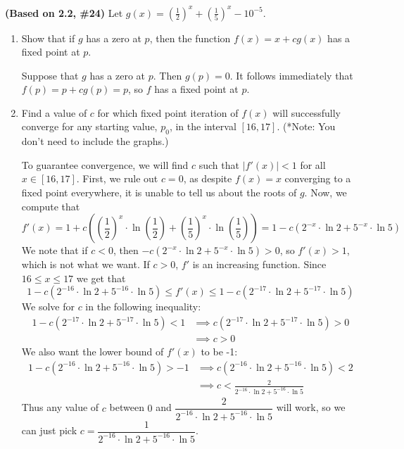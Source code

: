 \documentclass{eh-homework}
\begin{document}
\begin{question}{1}
    \textbf{(Based on 2.2, \#24)} Let \(g(x) = \left(\frac{1}{2}\right)^x + \left(\frac{1}{5}\right)^x - 10^{-5}\).
    
    \begin{enumerate}[label=\alph*.]
        \item Show that if \(g\) has a zero at \(p\), then the function \(f(x) = x + c g(x)\) has a fixed point at \(p\).
        
        Suppose that \(g\) has a zero at \(p\). Then \(g(p) = 0\). It follows immediately that \(f(p) = p + cg(p) = p\), so \(f\) has a fixed point at \(p\).
        
        \item Find a value of \(c\) for which fixed point iteration of \(f(x)\) will successfully converge for any starting value, \(p_0\), in the interval \([16, 17]\). (*Note: You don’t need to include the graphs.)
    
        To guarantee convergence, we will find \(c\) such that \(|f'(x)| < 1\) for all \(x \in [16,17]\). First, we rule out \(c=0\), as despite \(f(x) = x\) converging to a fixed point everywhere, it is unable to tell us about the roots of \(g\). Now, we compute that
        \[
            f'(x) = 1 + c\left( \left(\frac{1}{2}\right)^x \cdot \ln \left( \frac{1}{2} \right) + \left(\frac{1}{5}\right)^x \cdot \ln \left( \frac{1}{5} \right) \right) = 1 - c \left( 2^{-x} \cdot \ln 2 + 5^{-x} \cdot \ln 5 \right)
        \]
        We note that if \(c < 0\), then \(- c \left( 2^{-x} \cdot \ln 2 + 5^{-x} \cdot \ln 5 \right) > 0\), so \(f'(x) > 1\), which is not what we want. If \(c > 0\), \(f'\) is an increasing function. Since \(16 \leq x \leq 17\) we get that
        \[
            1 - c(2^{-16} \cdot \ln 2 + 5^{-16} \cdot \ln 5) \leq f'(x) \leq 1 - c(2^{-17} \cdot \ln 2 + 5^{-17} \cdot \ln 5)
        \]
        We solve for \(c\) in the following inequality:
        \begin{align*}
            1 - c(2^{-17} \cdot \ln 2 + 5^{-17} \cdot \ln 5) < 1 &\implies c(2^{-17} \cdot \ln 2 + 5^{-17} \cdot \ln 5) > 0 \\
            &\implies c > 0
        \end{align*}
        We also want the lower bound of \(f'(x)\) to be -1:
        \begin{align*}
            1 - c(2^{-16} \cdot \ln 2 + 5^{-16} \cdot \ln 5) > -1 &\implies c(2^{-16} \cdot \ln 2 + 5^{-16} \cdot \ln 5) < 2 \\
            &\implies c < \frac{2}{2^{-16} \cdot \ln 2 + 5^{-16} \cdot \ln 5}
        \end{align*}
        Thus any value of \(c\) between \(0\) and \(\dfrac{2}{2^{-16} \cdot \ln 2 + 5^{-16} \cdot \ln 5}\) will work, so we can just pick \(c = \dfrac{1}{2^{-16} \cdot \ln 2 + 5^{-16} \cdot \ln 5}\).


\end{enumerate}
\end{question}
\end{document}
